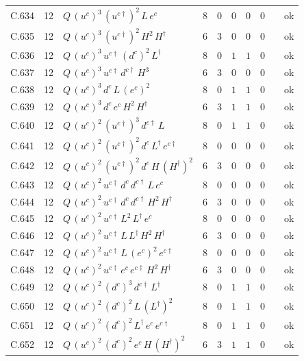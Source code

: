 {\begin{longtable}{@{}ll>{\raggedright\arraybackslash}p{6.4cm}rrllllr@{}}
C.634 & 12 & $Q\,(u^c)^{3}\,(u^{c\dagger})^{2}\,L\,e^c$ & 8 & 0 & $0$ & $0$ & $0$ &  & ok \\
C.635 & 12 & $Q\,(u^c)^{3}\,(u^{c\dagger})^{2}\,H^{2}\,H^\dagger$ & 6 & 3 & $0$ & $0$ & $0$ &  & ok \\
C.636 & 12 & $Q\,(u^c)^{3}\,u^{c\dagger}\,(d^c)^{2}\,L^\dagger$ & 8 & 0 & $1$ & $1$ & $0$ &  & ok \\
C.637 & 12 & $Q\,(u^c)^{3}\,u^{c\dagger}\,d^{c\dagger}\,H^{3}$ & 6 & 3 & $0$ & $0$ & $0$ &  & ok \\
C.638 & 12 & $Q\,(u^c)^{3}\,d^c\,L\,(e^c)^{2}$ & 8 & 0 & $1$ & $1$ & $0$ &  & ok \\
C.639 & 12 & $Q\,(u^c)^{3}\,d^c\,e^c\,H^{2}\,H^\dagger$ & 6 & 3 & $1$ & $1$ & $0$ &  & ok \\
C.640 & 12 & $Q\,(u^c)^{2}\,(u^{c\dagger})^{3}\,d^{c\dagger}\,L$ & 8 & 0 & $1$ & $1$ & $0$ &  & ok \\
C.641 & 12 & $Q\,(u^c)^{2}\,(u^{c\dagger})^{2}\,d^c\,L^\dagger\,e^{c\dagger}$ & 8 & 0 & $0$ & $0$ & $0$ &  & ok \\
C.642 & 12 & $Q\,(u^c)^{2}\,(u^{c\dagger})^{2}\,d^c\,H\,(H^\dagger)^{2}$ & 6 & 3 & $0$ & $0$ & $0$ &  & ok \\
C.643 & 12 & $Q\,(u^c)^{2}\,u^{c\dagger}\,d^c\,d^{c\dagger}\,L\,e^c$ & 8 & 0 & $0$ & $0$ & $0$ &  & ok \\
C.644 & 12 & $Q\,(u^c)^{2}\,u^{c\dagger}\,d^c\,d^{c\dagger}\,H^{2}\,H^\dagger$ & 6 & 3 & $0$ & $0$ & $0$ &  & ok \\
C.645 & 12 & $Q\,(u^c)^{2}\,u^{c\dagger}\,L^{2}\,L^\dagger\,e^c$ & 8 & 0 & $0$ & $0$ & $0$ &  & ok \\
C.646 & 12 & $Q\,(u^c)^{2}\,u^{c\dagger}\,L\,L^\dagger\,H^{2}\,H^\dagger$ & 6 & 3 & $0$ & $0$ & $0$ &  & ok \\
C.647 & 12 & $Q\,(u^c)^{2}\,u^{c\dagger}\,L\,(e^c)^{2}\,e^{c\dagger}$ & 8 & 0 & $0$ & $0$ & $0$ &  & ok \\
C.648 & 12 & $Q\,(u^c)^{2}\,u^{c\dagger}\,e^c\,e^{c\dagger}\,H^{2}\,H^\dagger$ & 6 & 3 & $0$ & $0$ & $0$ &  & ok \\
C.649 & 12 & $Q\,(u^c)^{2}\,(d^c)^{3}\,d^{c\dagger}\,L^\dagger$ & 8 & 0 & $1$ & $1$ & $0$ &  & ok \\
C.650 & 12 & $Q\,(u^c)^{2}\,(d^c)^{2}\,L\,(L^\dagger)^{2}$ & 8 & 0 & $1$ & $1$ & $0$ &  & ok \\
C.651 & 12 & $Q\,(u^c)^{2}\,(d^c)^{2}\,L^\dagger\,e^c\,e^{c\dagger}$ & 8 & 0 & $1$ & $1$ & $0$ &  & ok \\
C.652 & 12 & $Q\,(u^c)^{2}\,(d^c)^{2}\,e^c\,H\,(H^\dagger)^{2}$ & 6 & 3 & $1$ & $1$ & $0$ &  & ok \\

\end{longtable}}

